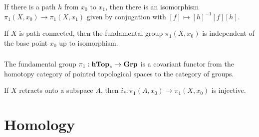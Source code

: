 \documentclass[12pt, oneside]{book}
\begin{document}
\begin{proposition}
    If there is a path $h$ from $x_0$ to $x_1$, then there is an isomorphism
    $\pi_1(X,x_0) \to \pi_1(X,x_1)$
    given by conjugation with $[f]\mapsto [h]^{-1}[f][h]$.
\end{proposition}

\begin{corollary}
    If $X$ is path-connected, then the fundamental group $\pi_1(X,x_0)$ is independent of the base point $x_0$ up to isomorphism.
\end{corollary}





\subsection{}

\begin{proposition}
    The fundamental group $\pi_1: \mathbf{hTop}_* \to \mathbf{Grp}$ is a covariant functor from the homotopy category of pointed topological spaces to the category of groups.
\end{proposition}


\begin{corollary}
    If $X$ retracts onto a subspace $A$, then $i_*: \pi_1(A,x_0) \to \pi_1(X,x_0)$ is injective.
\end{corollary}

\chapter{Homology}
\section{}
\end{document}
